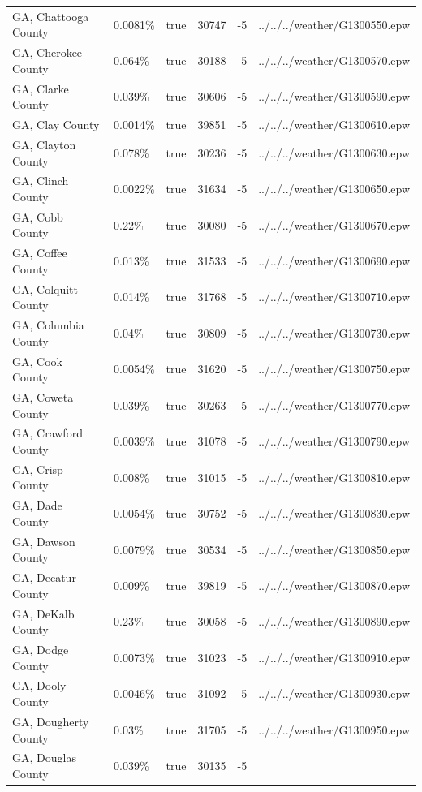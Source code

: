 \begin{longtable}[]{@{}llllll@{}}
GA, Chattooga County & 0.0081\% & true & 30747 & -5 &
../../../weather/G1300550.epw \\
GA, Cherokee County & 0.064\% & true & 30188 & -5 &
../../../weather/G1300570.epw \\
GA, Clarke County & 0.039\% & true & 30606 & -5 &
../../../weather/G1300590.epw \\
GA, Clay County & 0.0014\% & true & 39851 & -5 &
../../../weather/G1300610.epw \\
GA, Clayton County & 0.078\% & true & 30236 & -5 &
../../../weather/G1300630.epw \\
GA, Clinch County & 0.0022\% & true & 31634 & -5 &
../../../weather/G1300650.epw \\
GA, Cobb County & 0.22\% & true & 30080 & -5 &
../../../weather/G1300670.epw \\
GA, Coffee County & 0.013\% & true & 31533 & -5 &
../../../weather/G1300690.epw \\
GA, Colquitt County & 0.014\% & true & 31768 & -5 &
../../../weather/G1300710.epw \\
GA, Columbia County & 0.04\% & true & 30809 & -5 &
../../../weather/G1300730.epw \\
GA, Cook County & 0.0054\% & true & 31620 & -5 &
../../../weather/G1300750.epw \\
GA, Coweta County & 0.039\% & true & 30263 & -5 &
../../../weather/G1300770.epw \\
GA, Crawford County & 0.0039\% & true & 31078 & -5 &
../../../weather/G1300790.epw \\
GA, Crisp County & 0.008\% & true & 31015 & -5 &
../../../weather/G1300810.epw \\
GA, Dade County & 0.0054\% & true & 30752 & -5 &
../../../weather/G1300830.epw \\
GA, Dawson County & 0.0079\% & true & 30534 & -5 &
../../../weather/G1300850.epw \\
GA, Decatur County & 0.009\% & true & 39819 & -5 &
../../../weather/G1300870.epw \\
GA, DeKalb County & 0.23\% & true & 30058 & -5 &
../../../weather/G1300890.epw \\
GA, Dodge County & 0.0073\% & true & 31023 & -5 &
../../../weather/G1300910.epw \\
GA, Dooly County & 0.0046\% & true & 31092 & -5 &
../../../weather/G1300930.epw \\
GA, Dougherty County & 0.03\% & true & 31705 & -5 &
../../../weather/G1300950.epw \\
GA, Douglas County & 0.039\% & true & 30135 & -5 &

\end{longtable}
